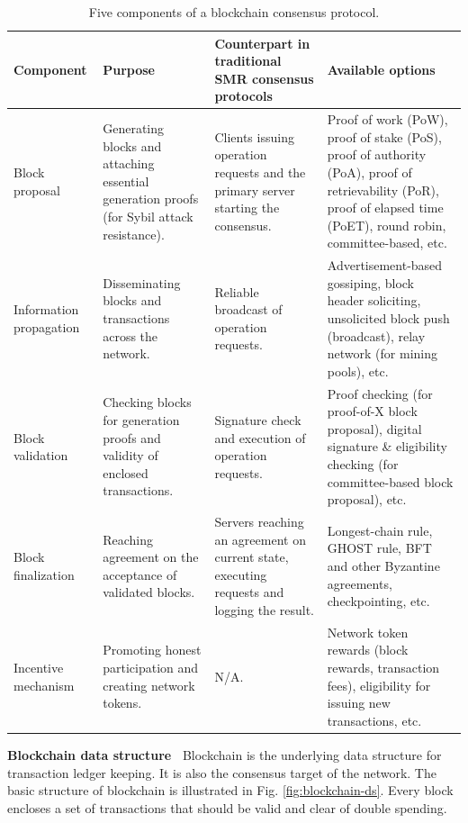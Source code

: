 \begin{table}
    \centering
    \caption{Five components of a blockchain consensus protocol.}
    \renewcommand{\arraystretch}{1.2}
    \small
    \begin{tabular} {|p{0.6in}||p{1.4in}| p{1.6in}| p{2.7in}|}
        \hline
        \textbf{Component} & \textbf{Purpose} & \textbf{Counterpart in traditional SMR consensus protocols} & \textbf{Available options} \\ \hline \hline
        Block \hspace{1in} proposal & Generating blocks and attaching essential generation proofs (for Sybil attack resistance).  & Clients issuing operation requests and the primary server starting the consensus. & Proof of work (PoW), proof of stake (PoS),  proof of authority (PoA), proof of retrievability (PoR), proof of elapsed time (PoET), round robin, committee-based, etc. \\ \hline
        Information propagation & Disseminating blocks and transactions across the network. & Reliable broadcast of operation requests. & Advertisement-based gossiping, block header soliciting, unsolicited block push (broadcast), relay network (for mining pools), etc. \\ \hline
        Block \hspace{1in} validation & Checking blocks for generation proofs and validity of enclosed transactions. & Signature check and execution of operation requests. & Proof checking (for proof-of-X block proposal), digital signature \& eligibility checking (for committee-based block proposal), etc. \\ \hline
        Block \hspace{1in} finalization & Reaching agreement on the acceptance of validated blocks. & Servers reaching an agreement on current state, executing requests and logging the result. & Longest-chain rule, GHOST rule, BFT and other Byzantine agreements, checkpointing, etc. \\ \hline
        Incentive mechanism & Promoting honest participation and creating network tokens. & N/A. & Network token rewards (block rewards, transaction fees), eligibility for issuing new transactions, etc. \\ \hline
    \end{tabular}
    \renewcommand{\arraystretch}{1}
    \label{tab:protocol-components}
\end{table}
\textbf{Blockchain data structure~}
Blockchain is the underlying data structure for transaction ledger keeping. It is also the consensus target of the network. The basic structure of blockchain is illustrated in Fig. \ref{fig:blockchain-ds}. Every block encloses a set of transactions that should be valid and clear of double spending.
